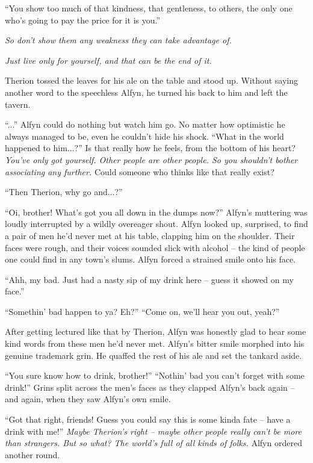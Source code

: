 ``You show too much of that kindness, that gentleness, to others, the only one who's going to pay the price for it is you.''

\emph{So don't show them any weakness they can take advantage of.}

\emph{Just live only for yourself, and that can be the end of it.}

Therion tossed the leaves for his ale on the table and stood up. Without saying another word to the speechless Alfyn, he turned his back to him and left the tavern.

``...'' Alfyn could do nothing but watch him go. No matter how optimistic he always managed to be, even he couldn't hide his shock. ``What in the world happened to him...?'' Is that really how he feels, from the bottom of his heart? \emph{You've only got yourself. Other people are other people. So you shouldn't bother associating any further.} Could someone who thinks like that really exist?

``Then Therion, why go and...?''

``Oi, brother! What's got you all down in the dumps now?'' Alfyn's muttering was loudly interrupted by a wildly overeager shout. Alfyn looked up, surprised, to find a pair of men he'd never met at his table, clapping him on the shoulder. Their faces were rough, and their voices sounded slick with alcohol -- the kind of people one could find in any town's slums. Alfyn forced a strained smile onto his face. 

``Ahh, my bad. Just had a nasty sip of my drink here -- guess it showed on my face.''

``Somethin' bad happen to ya? Eh?'' ``Come on, we'll hear you out, yeah?''

After getting lectured like that by Therion, Alfyn was honestly glad to hear some kind words from these men he'd never met. Alfyn's bitter smile morphed into his genuine trademark grin. He quaffed the rest of his ale and set the tankard aside.

``You sure know how to drink, brother!'' ``Nothin' bad you can't forget with some drink!'' Grins split across the men's faces as they clapped Alfyn's back again -- and again, when they saw Alfyn's own smile.

``Got that right, friends! Guess you could say this is some kinda fate -- have a drink with me!'' \emph{Maybe Therion's right -- maybe other people really can't be more than strangers. But so what? The world's full of all kinds of folks.} Alfyn ordered another round.

